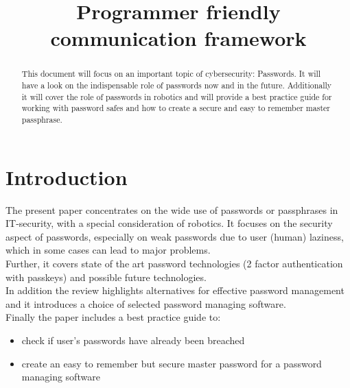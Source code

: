 \documentclass[conference]{IEEEtran}
\begin{document}
\title{Programmer friendly communication framework}

\author{
    \and
}

\maketitle

\begin{abstract}
    This document will focus on an important topic of cybersecurity: Passwords. It will have a look on the indispensable role of passwords now and in the future. Additionally it will cover the role of passwords in robotics and will provide a best practice guide for working with password safes and how to create a secure and easy to remember master passphrase.
\end{abstract}

\section{Introduction}
The present paper concentrates on the wide use of passwords or passphrases in IT-security, with a special consideration of robotics. It focuses on the security aspect of passwords, especially on weak passwords due to user (human) laziness, which in some cases can lead to major problems. \\
Further, it covers state of the art password technologies (2 factor authentication with passkeys) and possible future technologies.\\
In addition the review highlights alternatives for effective password management and it introduces a choice of selected password managing software. \\
Finally the paper includes a best practice guide to:
\begin{itemize}
    \item check if user's passwords have already been breached
    \item create an easy to remember but secure master password for a password managing software
\end{itemize}
\end{document}
